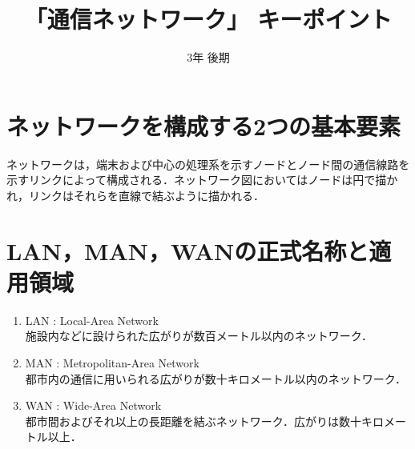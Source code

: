 \documentclass[10.5pt]{jsarticle}
\title{「通信ネットワーク」 キーポイント}
\author{}
\date{\vspace{-10mm}3年 後期}
\begin{document}
\maketitle
\thispagestyle{fancy}

\section{ネットワークを構成する2つの基本要素}
ネットワークは，端末および中心の処理系を示すノードとノード間の通信線路を示すリンクによって構成される．ネットワーク図においてはノードは円で描かれ，リンクはそれらを直線で結ぶように描かれる．

\section{LAN，MAN，WANの正式名称と適用領域}
\begin{enumerate}
	\item{LAN : Local-Area Network}\\
		施設内などに設けられた広がりが数百メートル以内のネットワーク．
	\item{MAN : Metropolitan-Area Network}\\
		都市内の通信に用いられる広がりが数十キロメートル以内のネットワーク．
	\item{WAN : Wide-Area Network}\\
		都市間およびそれ以上の長距離を結ぶネットワーク．広がりは数十キロメートル以上．
\end{enumerate}
\end{document}
